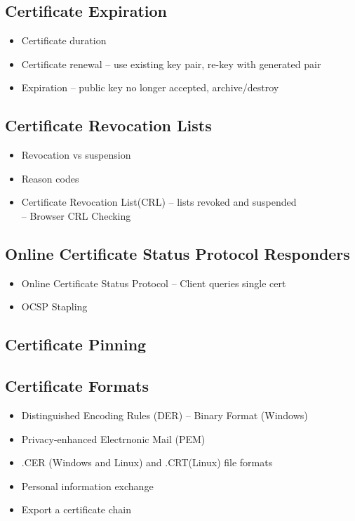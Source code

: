 	\subsection {Certificate Expiration}
		\begin{itemize}
			\item Certificate duration
			\item Certificate renewal -- use existing key pair, re-key with generated pair
			\item Expiration -- public key no longer accepted, archive/destroy
		\end{itemize}
	\subsection {Certificate Revocation Lists}
		\begin{itemize}
			\item Revocation vs suspension
			\item Reason codes
			\item Certificate Revocation List(CRL) -- lists revoked and suspended \\
				-- Browser CRL Checking
		\end{itemize}
	\subsection {Online Certificate Status Protocol Responders}
		\begin{itemize}
			\item Online Certificate Status Protocol -- Client queries single cert
			\item OCSP Stapling
		\end{itemize}
	\subsection {Certificate Pinning}
	\subsection {Certificate Formats}
		\begin{itemize}
			\item Distinguished Encoding Rules (DER) -- Binary Format (Windows)
			\item Privacy-enhanced Electrnonic Mail (PEM)
			\item .CER (Windows and Linux)  and .CRT(Linux) file formats
			\item Personal information exchange
			\item Export a certificate chain
		\end{itemize}
